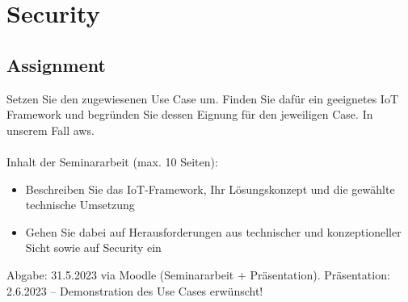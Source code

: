 \chapter{Security}

\section{Assignment}
Setzen Sie den zugewiesenen Use Case um.
Finden Sie dafür ein geeignetes IoT Framework und begründen Sie dessen Eignung für den jeweiligen Case. In unserem Fall \ac{aws}.\\
\\
Inhalt der Seminararbeit (max. 10 Seiten):
\begin{itemize}
    \item Beschreiben Sie das IoT-Framework, Ihr Lösungskonzept und die gewählte technische Umsetzung
    \item Gehen Sie dabei auf Herausforderungen aus technischer und konzeptioneller Sicht sowie auf Security ein
\end{itemize}
Abgabe: 31.5.2023 via Moodle (Seminararbeit + Präsentation). Präsentation: 2.6.2023 – Demonstration des Use Cases erwünscht!



